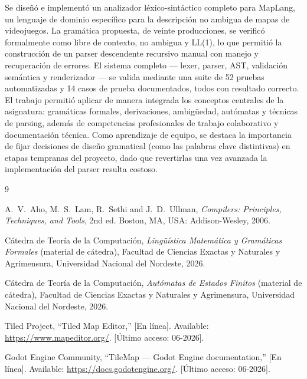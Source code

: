 \documentclass[10pt,twocolumn]{article}
\begin{document}
Se diseñó e implementó un analizador léxico-sintáctico completo para
MapLang, un lenguaje de dominio específico para la descripción no ambigua
de mapas de videojuegos. La gramática propuesta, de veinte producciones,
se verificó formalmente como libre de contexto, no ambigua y LL(1), lo que
permitió la construcción de un parser descendente recursivo manual con
manejo y recuperación de errores. El sistema completo --- lexer, parser,
AST, validación semántica y renderizador --- se valida mediante una suite
de 52 pruebas automatizadas y 14 casos de prueba documentados, todos con
resultado correcto. El trabajo permitió aplicar de manera integrada los
conceptos centrales de la asignatura: gramáticas formales, derivaciones,
ambigüedad, autómatas y técnicas de parsing, además de competencias
profesionales de trabajo colaborativo y documentación técnica. Como
aprendizaje de equipo, se destaca la importancia de fijar decisiones de
diseño gramatical (como las palabras clave distintivas) en etapas
tempranas del proyecto, dado que revertirlas una vez avanzada la
implementación del parser resulta costoso.

\renewcommand{\refname}{Bibliografía}
\begin{thebibliography}{9}

A.~V.~Aho, M.~S.~Lam, R.~Sethi and J.~D.~Ullman,
\textit{Compilers: Principles, Techniques, and Tools}, 2nd ed.
Boston, MA, USA: Addison-Wesley, 2006.

Cátedra de Teoría de la Computación,
\textit{Lingüística Matemática y Gramáticas Formales} (material de
cátedra), Facultad de Ciencias Exactas y Naturales y Agrimensura,
Universidad Nacional del Nordeste, 2026.

Cátedra de Teoría de la Computación,
\textit{Autómatas de Estados Finitos} (material de cátedra), Facultad de
Ciencias Exactas y Naturales y Agrimensura, Universidad Nacional del
Nordeste, 2026.

Tiled Project, ``Tiled Map Editor,'' [En línea]. Available:
\url{https://www.mapeditor.org/}. [Último acceso: 06-2026].

Godot Engine Community, ``TileMap --- Godot Engine documentation,'' [En
línea]. Available: \url{https://docs.godotengine.org/}. [Último acceso:
06-2026].

\end{thebibliography}
\end{document}

